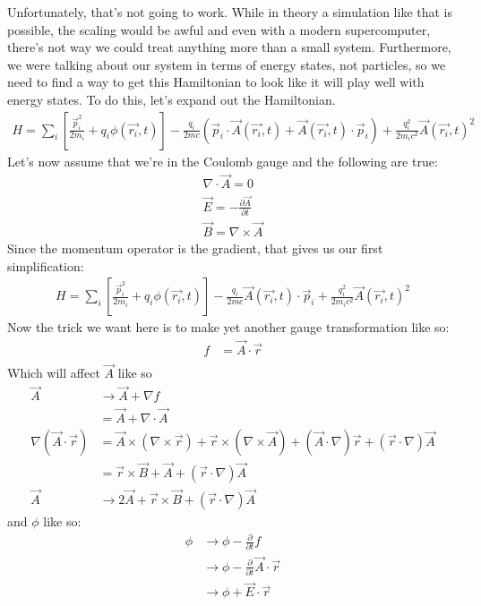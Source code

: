 Unfortunately, that's not going to work.  While in theory a simulation like that is possible, the scaling would be awful and even with a modern supercomputer, there's not way we could treat anything more than a small system.  Furthermore, we were talking about our system in terms of energy states, not particles, so we need to find a way to get this Hamiltonian to look like it will play well with energy states.  To do this, let's expand out the Hamiltonian.
\begin{align}
	H = \sum_i \left[ \frac{\vec{p}_i^2}{2 m_i} + q_i \phi(\vec{r_i}, t) \right] - \frac{q_i}{2 m c} \left(\vec{p}_i \cdot \vec{A}(\vec{r_i}, t) +  \vec{A}(\vec{r_i}, t)\cdot \vec{p}_i \right) + \frac{q_i^2 }{2 m_i c^2} \vec{A}(\vec{r_i}, t)^2
\end{align}
Let's now assume that we're in the Coulomb gauge and the following are true:
\begin{eqnarray}
	\nabla \cdot \vec{A} = 0 \\
	\vec{E} = -\frac{\partial \vec{A}}{\partial t} \\
	\vec{B} = \nabla \times \vec{A}
\end{eqnarray}
Since the momentum operator is the gradient, that gives us our first simplification:
\begin{align}
	H = \sum_i \left[ \frac{\vec{p}_i^2}{2 m_i} + q_i \phi(\vec{r_i}, t) \right] - \frac{q_i}{2 m c} \vec{A}(\vec{r_i}, t)\cdot \vec{p}_i  + \frac{q_i^2 }{2 m_i c^2} \vec{A}(\vec{r_i}, t)^2
\end{align}
Now the trick we want here is to make yet another gauge transformation like so:
\begin{align}
	f &= \vec{A}\cdot \vec{r} \\
\end{align}
Which will affect $\vec{A}$ like so
\begin{align*}
	\vec{A} &\rightarrow \vec{A} + \nabla f \\
			&=\vec{A} + \nabla \cdot \vec{A} \\
	\nabla \left(  \vec{A}\cdot \vec{r}  \right) &= \vec{A} \times (\nabla \times \vec{r}) + \vec{r}\times (\nabla \times \vec{A} ) + (\vec{A} \cdot \nabla ) \vec{r} + (\vec{r} \cdot \nabla )\vec{A} \\
	&= \vec{r}\times \vec{B} + \vec{A} + (\vec{r} \cdot \nabla )\vec{A} \\
	\vec{A} &\rightarrow 2\vec{A} + \vec{r}\times \vec{B}  + (\vec{r} \cdot \nabla )\vec{A}
\end{align*}
and $\phi$ like so:
\begin{align*}
	\phi &\rightarrow \phi -\frac{\partial}{\partial t} f \\
	&\rightarrow \phi -\frac{\partial}{\partial t} \vec{A}\cdot \vec{r} \\
	&\rightarrow \phi + \vec{E} \cdot \vec{r}
\end{align*}
